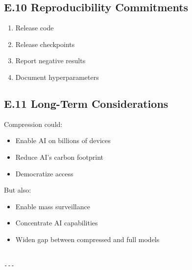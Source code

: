 \subsection{E.10 Reproducibility Commitments}

\begin{enumerate}
\item Release code
\item Release checkpoints
\item Report negative results
\item Document hyperparameters

\end{enumerate}
\subsection{E.11 Long-Term Considerations}

Compression could:

\begin{itemize}
\item Enable AI on billions of devices
\item Reduce AI's carbon footprint
\item Democratize access

\end{itemize}
But also:

\begin{itemize}
\item Enable mass surveillance
\item Concentrate AI capabilities
\item Widen gap between compressed and full models
\end{itemize}
\begin{lstlisting}

---
\end{lstlisting}